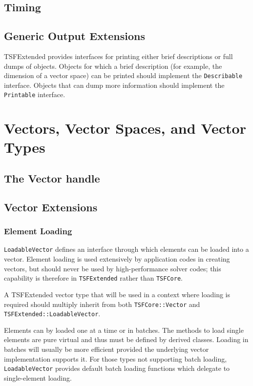 \subsection{Timing}

\subsection{Generic Output Extensions}

TSFExtended provides interfaces for printing either brief descriptions or
full dumps of objects. Objects for which a brief description (for example,
the dimension of a vector space) can be printed should implement
the \verb+Describable+ interface. Objects that can dump more information
should implement the \verb+Printable+ interface.

\section{Vectors, Vector Spaces, and Vector Types}

\subsection{The Vector handle}

\subsection{Vector Extensions}

\subsubsection{Element Loading}

\verb+LoadableVector+ defines an interface through which elements can be
loaded into a vector. Element loading is used extensively by
application codes in creating vectors, but should never be used by
high-performance solver codes; this capability is therefore in
\verb+TSFExtended+ rather than \verb+TSFCore+.

   
A TSFExtended vector type that will be used in a context where
loading is required should multiply inherit from both
\verb+TSFCore::Vector+ and \verb+TSFExtended::LoadableVector+.
    
Elements can by loaded one at a time or in batches. The methods to
load single elements are pure virtual and thus must be defined by
derived classes. Loading in batches will usually be more efficient
provided the underlying vector implementation supports it. For
those types not supporting batch loading, \verb+LoadableVector+ provides
default batch loading functions which delegate to single-element
loading.
   
